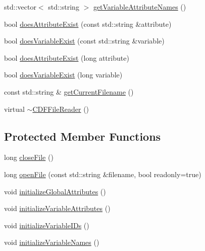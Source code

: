 \begin{DoxyCompactItemize}
\item 
std\-::vector$<$ std\-::string $>$ \hyperlink{classccmc_1_1_c_d_f_file_reader_a52a904328cc0cb1ca7625c9469ca11ca}{get\-Variable\-Attribute\-Names} ()
\item 
bool \hyperlink{classccmc_1_1_c_d_f_file_reader_a2a13faebed9123459d75413e1388d6fa}{does\-Attribute\-Exist} (const std\-::string \&attribute)
\item 
bool \hyperlink{classccmc_1_1_c_d_f_file_reader_a6211014aebd161eb08dcddf7d249743a}{does\-Variable\-Exist} (const std\-::string \&variable)
\item 
bool \hyperlink{classccmc_1_1_c_d_f_file_reader_a6360eae4aeec86d95b750711fbfefcb6}{does\-Attribute\-Exist} (long attribute)
\item 
bool \hyperlink{classccmc_1_1_c_d_f_file_reader_a23a40091a6f58aaee5788d449dd87aa4}{does\-Variable\-Exist} (long variable)
\item 
const std\-::string \& \hyperlink{classccmc_1_1_c_d_f_file_reader_ab8274e8003b7700b2b860aef29a2cd6f}{get\-Current\-Filename} ()
\item 
virtual \hyperlink{classccmc_1_1_c_d_f_file_reader_a71fd30b3d6509401ea788aab46a1a142}{$\sim$\-C\-D\-F\-File\-Reader} ()
\end{DoxyCompactItemize}
\subsection*{Protected Member Functions}
\begin{DoxyCompactItemize}
\item 
long \hyperlink{classccmc_1_1_c_d_f_file_reader_a3eedaa5cdd71af7b4bf668ff3c9928ce}{close\-File} ()
\item 
long \hyperlink{classccmc_1_1_c_d_f_file_reader_a040e6e9a2c9f8e4aae6673fdc4a92cdb}{open\-File} (const std\-::string \&filename, bool readonly=true)
\item 
void \hyperlink{classccmc_1_1_c_d_f_file_reader_ae79ea609f0de436d1f78809668d1b84e}{initialize\-Global\-Attributes} ()
\item 
void \hyperlink{classccmc_1_1_c_d_f_file_reader_adf5fe4154607e05e6d5e8652f26c0d86}{initialize\-Variable\-Attributes} ()
\item 
void \hyperlink{classccmc_1_1_c_d_f_file_reader_a20efd34232f8348d44291b589a94d56a}{initialize\-Variable\-I\-Ds} ()
\item 
void \hyperlink{classccmc_1_1_c_d_f_file_reader_ab9c343c409df6b079c270e9598ac0fd0}{initialize\-Variable\-Names} ()
\end{DoxyCompactItemize}
